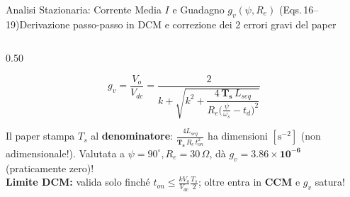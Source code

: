 \documentclass[aspectratio=169,9pt]{beamer}
\newcommand{\Ohm}{\,\Omega}
\begin{document}
\begin{frame}{Analisi Stazionaria: Corrente Media $I$ e Guadagno $g_v(\psi, R_e)$ (Eqs.\,16--19)}{Derivazione passo-passo in DCM e correzione dei 2 errori gravi del paper}
\begin{columns}[T,onlytextwidth]
\begin{column}{0.50\textwidth}
      \begin{okbox}[title={Eq.\,(18) Fisicamente Corretta (valida solo in DCM!)}]
        \[
          g_v = \frac{V_o}{V_{dc}} = \frac{2}{k + \sqrt{k^2 + \dfrac{4\,\mathbf{T_s}\,L_{seq}}{R_e \bigl(\frac{\psi}{\omega_s} - t_d\bigr)^2}}}
        \]
      \end{okbox}
      \vspace*{1mm}
      \begin{warnbox}[title={Errore Dimensionale Fatale in Eq.\,(18) del Paper!}]
        Il paper stampa $T_s$ al \textbf{denominatore}: $\frac{4 L_{seq}}{\mathbf{T_s}\,R_e\,t_{on}^2}$ ha dimensioni $[\text{s}^{-2}]$ (non adimensionale!). Valutata a $\psi=90^\circ, R_e=30\Ohm$, d\`a $g_v = \mathbf{3.86\times 10^{-6}}$ (praticamente zero)!\\
        \textbf{Limite DCM:} valida solo finch\'e $t_{on} \le \frac{kV_o}{V_{dc}}\frac{T_s}{2}$; oltre entra in \textbf{CCM} e $g_v$ satura!
      \end{warnbox}
    \end{column}
  \end{columns}
\end{frame}
\end{document}

